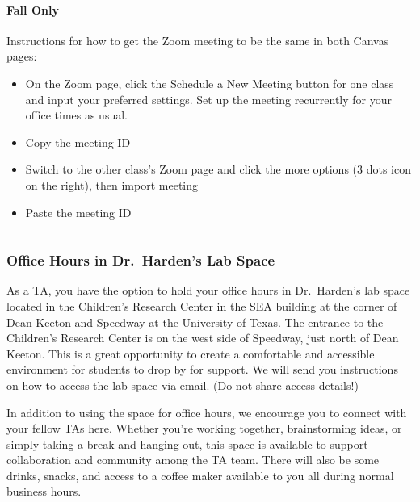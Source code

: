 \documentclass[
]{article}
\begin{document}
\hypertarget{fall-only}{%
\paragraph{Fall Only}\label{fall-only}}

Instructions for how to get the Zoom meeting to be the same in both Canvas pages:

\begin{itemize}
\item
  On the Zoom page, click the Schedule a New Meeting button for one class and input your preferred settings. Set up the meeting recurrently for your office times as usual.
\item
  Copy the meeting ID
\item
  Switch to the other class's Zoom page and click the more options (3 dots icon on the right), then import meeting
\item
  Paste the meeting ID
\end{itemize}

\begin{center}\rule{0.5\linewidth}{0.5pt}\end{center}

\hypertarget{office-hours-in-dr-hardens-lab-space}{%
\subsubsection*{Office Hours in Dr.~Harden's Lab Space}\label{office-hours-in-dr-hardens-lab-space}}

As a TA, you have the option to hold your office hours in Dr.~Harden's lab space located in the Children's Research Center in the SEA building at the corner of Dean Keeton and Speedway at the University of Texas. The entrance to the Children's Research Center is on the west side of Speedway, just north of Dean Keeton. This is a great opportunity to create a comfortable and accessible environment for students to drop by for support. We will send you instructions on how to access the lab space via email. (Do not share access details!)

In addition to using the space for office hours, we encourage you to connect with your fellow TAs here. Whether you're working together, brainstorming ideas, or simply taking a break and hanging out, this space is available to support collaboration and community among the TA team. There will also be some drinks, snacks, and access to a coffee maker available to you all during normal business hours.
\end{document}

